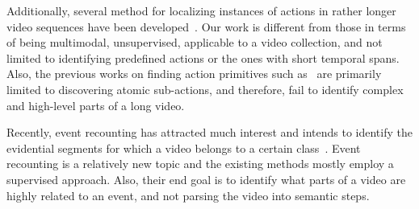 Additionally, several method for localizing instances of actions in rather longer video sequences have been developed~\cite{duchenne09_iccv, hoai11_cvpr, laptev07_iccv, bojanowski14_eccv, pirsiavash14_cvpr}. Our work is different from those in terms of being multimodal, unsupervised, applicable to a video collection, and not limited to identifying predefined actions or the ones with short temporal spans.
Also, the previous works on finding action primitives such as~\cite{niebles10_eccv, yao10b_cvpr, jain13_cvpr,lan14_eccv, lan14_vs} are primarily limited to discovering atomic sub-actions, and therefore, fail to identify complex and high-level parts of a long video.

Recently, event recounting has attracted much interest and intends to identify the evidential segments for which a video belongs to a certain class~\cite{sun2014discover,das2013thousand,barbu2012video}. Event recounting is a relatively new topic and the existing methods mostly employ a supervised approach. Also, their end goal is to identify what parts of a video are highly related to an event, and not parsing the video into semantic steps. 


